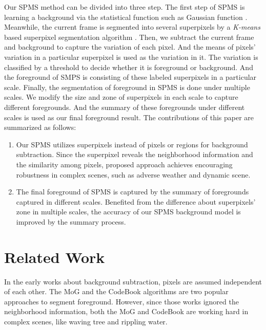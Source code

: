 \documentclass[runningheads,a4paper]{llncs}
\begin{document}
Our SPMS method can be divided into three step.
The first step of SPMS is learning a background via the statistical function such as
Gaussian function \cite{1997_TPAMI_GAUSS}.
Meanwhile, the current frame is segmented into several superpixels by a
\emph{K-means} based superpixel segmentation algorithm \cite{2012_TPAMI_SLIC}.
Then, we subtract the current frame and background to capture the variation of each pixel.
And the means of pixels' variation in a particular superpixel is used as the
variation in it.
The variation is classified by a threshold to decide whether it
is foreground or background.
And the foreground of SMPS is consisting of these labeled superpixels in a
particular scale.
Finally, the segmentation of foreground in SPMS is done under multiple scales.
We modify the size and zone of superpixels in each scale to capture different foregrounds.
And the summary of these foregrounds under different scales is used as our final
foreground result.
The contributions of this paper are summarized as follows:
\begin{enumerate}
    \item Our SPMS utilizes superpixels instead of pixels or regions for
        background subtraction. Since the superpixel reveals the neighborhood
        information and the similarity among pixels, proposed approach achieves
        encouraging robustness in complex scenes, such as adverse weather and
        dynamic scene.
    \item The final foreground of SPMS is captured by the summary of
        foregrounds captured in different scales. Benefited from the difference
        about superpixels' zone in multiple scales, the accuracy of our SPMS
        background model is improved by the summary process.
\end{enumerate}

\section{Related Work}
In the early works about background subtraction, pixels are assumed independent
of each other.
The MoG \cite{1997_TPAMI_GAUSS} \cite{1999_CVPR_MoG} and the CodeBook
\cite{2004_ICIP_CodeBook} \cite{2006_RTI_CodeBook} algorithms are two
popular approaches to segment foreground.
However, since those works ignored the neighborhood information, both
the MoG \cite{1999_CVPR_MoG} and CodeBook \cite{2006_RTI_CodeBook} are
working hard in complex scenes, like waving tree and rippling water.
\end{document}
